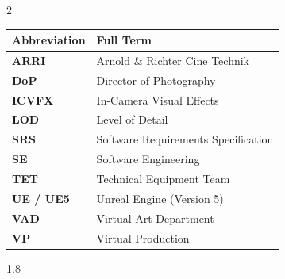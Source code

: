 \documentclass[12pt,a4paper]{report}
\begin{document}
\newpage
{}
\begin{spacing}{2}
    \renewcommand{\arraystretch}{1.5}
    \begin{center}
    \begin{tabular*}{\textwidth}{@{\extracolsep{\fill}}ll@{}}
        	\toprule
        \large{\textbf{Abbreviation}} & \large{\textbf{Full Term}} \\
        \midrule
        	\textbf{ARRI} & Arnold \& Richter Cine Technik \\
        	\textbf{DoP} & Director of Photography \\
        	\textbf{ICVFX} & In-Camera Visual Effects \\
        	\textbf{LOD} & Level of Detail \\
        	\textbf{SRS} & Software Requirements Specification \\
        	\textbf{SE} & Software Engineering \\
        	\textbf{TET} & Technical Equipment Team \\
        	\textbf{UE / UE5} & Unreal Engine (Version 5) \\
        	\textbf{VAD} & Virtual Art Department \\
        	\textbf{VP}  & Virtual Production \\
        \bottomrule
    \end{tabular*}
    \end{center}
    \renewcommand{\arraystretch}{1}
\end{spacing}



\newpage
\begin{spacing}{1.8}
    \tableofcontents
\end{spacing}
\newpage

\maketitle
\end{document}
